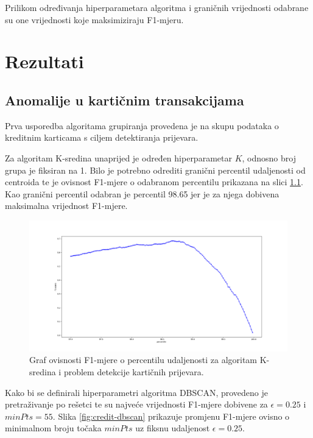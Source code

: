 \documentclass[utf8, diplomski, numeric]{fer}
\begin{document}
Prilikom određivanja hiperparametara algoritma i graničnih vrijednosti odabrane su one vrijednosti koje maksimiziraju F1-mjeru.


\chapter{Rezultati} \label{ch:sixth}
\section{Anomalije u kartičnim transakcijama}
Prva usporedba algoritama grupiranja provedena je na skupu podataka o kreditnim karticama s ciljem detektiranja prijevara.

Za algoritam K-sredina unaprijed je određen hiperparametar $K$, odnosno broj grupa je fiksiran na 1. Bilo je potrebno odrediti granični percentil udaljenosti od centroida te je ovisnost F1-mjere o odabranom percentilu prikazana na slici \ref{fig:credit-kmeans}. Kao granični percentil odabran je percentil 98.65 jer je za njega dobivena maksimalna vrijednost F1-mjere.

\begin{figure}[h!]
\includegraphics[width=1\textwidth]{images/credit-kmeans-f1.png}
\centering
\caption{Graf ovisnosti F1-mjere o percentilu udaljenosti za algoritam K-sredina i problem detekcije kartičnih prijevara.}
\label{fig:credit-kmeans}
\end{figure}

Kako bi se definirali hiperparametri algoritma DBSCAN, provedeno je pretraživanje po rešetci te su najveće vrijednosti F1-mjere dobivene za $\epsilon = 0.25$ i $minPts = 55$. Slika \ref{fig:credit-dbscan} prikazuje promjenu F1-mjere ovisno o minimalnom broju točaka $minPts$ uz fiksnu udaljenost $\epsilon = 0.25$.
\end{document}
